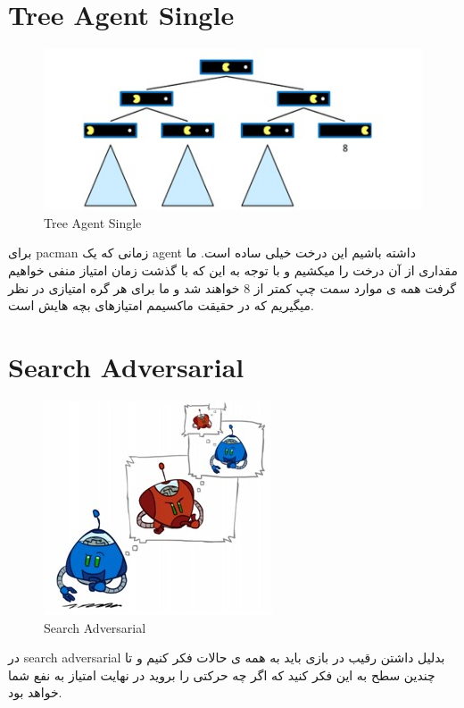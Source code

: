 \section{Tree Agent Single}

\begin{figure}[h!]
    \centering
    \includegraphics[width=0.8\linewidth]{images/singleagenttree.jpg}
    \caption{Tree Agent Single}
\end{figure}

برای pacman زمانی که یک agent داشته باشیم این درخت خیلی ساده است. ما مقداری از آن درخت را میکشیم و با توجه به این که با گذشت زمان امتیاز منفی خواهیم گرفت همه ی موارد سمت چپ کمتر از 8 خواهند شد و ما برای هر گره امتیازی در نظر میگیریم که در حقیقت ماکسیمم امتیازهای بچه هایش است.


\section{Search Adversarial}

\begin{figure}[h!]
    \centering
    \includegraphics[width=0.6\linewidth]{images/adversarial01.jpg}
    \caption{Search Adversarial}
\end{figure}

در search adversarial بدلیل داشتن رقیب در بازی  باید به همه ی حالات فکر کنیم و تا چندین سطح به این فکر کنید که اگر چه حرکتی را بروید در نهایت امتیاز به نفع شما خواهد بود.

